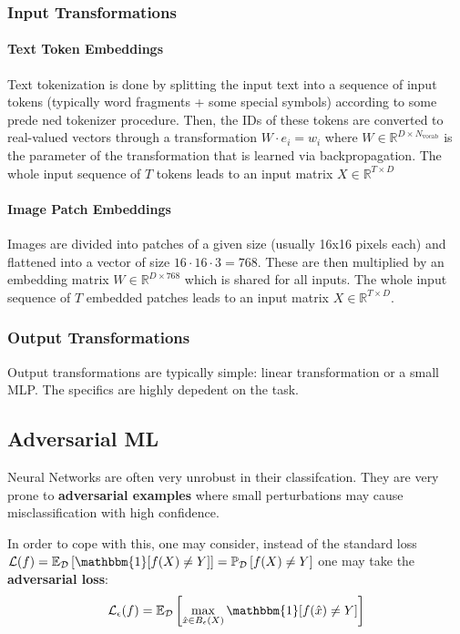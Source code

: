 \documentclass{article}
\newcommand{\R}{\mathbb{R}}
\newcommand{\prob}{\mathbb{P}}
\newcommand{\E}{\mathbb{E}}
\newcommand{\ind}{\mathbbm{1}}
\newcommand{\loss}{\mathcal{L}}
\newcommand{\dist}{\mathcal{D}}
\begin{document}
\subsubsection{Input Transformations}

\paragraph{Text Token Embeddings}

Text tokenization is done by splitting the input text into a sequence of input tokens (typically word fragments + some special symbols) according to some prede ned tokenizer procedure.
Then, the IDs of these tokens are converted to real-valued vectors through a transformation $W \cdot e_i = w_i$ where $W \in \R^{D \times N_\text{vocab}}$ is the parameter of the transformation that is learned via backpropagation.
The whole input sequence of $T$ tokens leads to an input matrix $X \in \R^{T \times D}$

\paragraph{Image Patch Embeddings}

Images are divided into patches of a given size (usually 16x16 pixels each) and flattened into a vector of size $16 \cdot 16 \cdot 3 = 768$.
These are then multiplied by an embedding matrix $W \in \R^{D \times 768}$ which is shared for all inputs.
The whole input sequence of $T$ embedded patches leads to an input matrix $X \in \R^{T \times D}$.

\subsubsection{Output Transformations}

Output transformations are typically simple: linear transformation or a small MLP.
The specifics are highly depedent on the task.

\subsection{Adversarial ML}

Neural Networks are often very unrobust in their classifcation.
They are very prone to \textbf{adversarial examples} where small perturbations may cause misclassification with high confidence.

In order to cope with this, one may consider, instead of the standard loss $\loss(f) = \E_\dist \left[ \ind[f(X) \neq Y]\right] = \prob_\dist \left[f(X) \neq Y\right]$ one may take the \textbf{adversarial loss}:
$$
\loss_\epsilon(f) = 
\E_\dist \left[ \max_{\hat{x} \in B_\epsilon(X)} \ind[ f(\hat{x}) \neq Y] \right] 
$$
\end{document}
